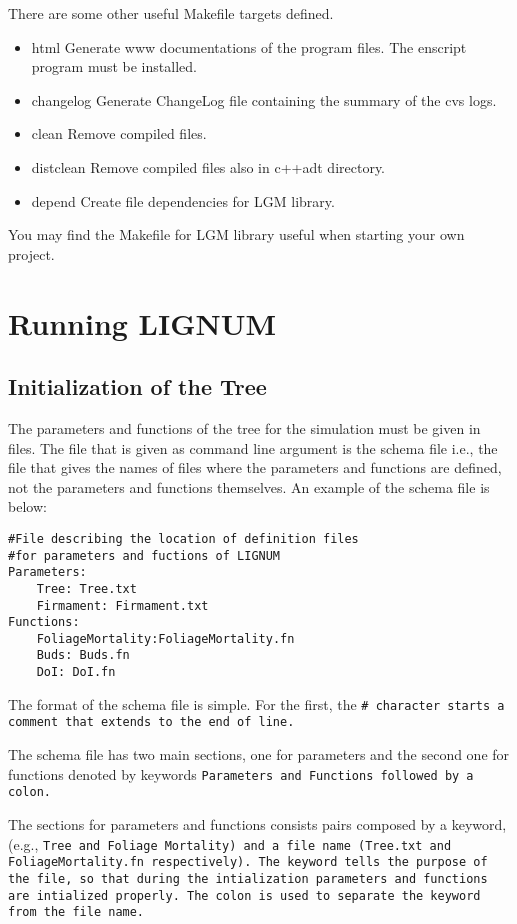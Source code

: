 There are some other useful Makefile targets defined.
\begin{itemize}
\item html Generate www documentations of the program files. The
enscript program must be installed.
\item changelog Generate ChangeLog file containing the summary of the
cvs logs.
\item clean Remove compiled files.
\item distclean Remove compiled files also in c++adt directory.
\item depend Create file dependencies for LGM library.
\end{itemize}
You may find the Makefile for LGM library useful when starting your
own project. 

\section{Running LIGNUM}

\subsection{Initialization of the Tree}

The parameters and functions of the tree for the simulation 
must be given in files. The file that is given as command 
line argument is the schema file i.e., the file that gives the 
names of files where the parameters and functions are defined, 
not the parameters and functions themselves. An example of the schema file
is below:

\begin{verbatim}
#File describing the location of definition files
#for parameters and fuctions of LIGNUM
Parameters:
    Tree: Tree.txt 
    Firmament: Firmament.txt
Functions:
    FoliageMortality:FoliageMortality.fn
    Buds: Buds.fn
    DoI: DoI.fn
\end{verbatim}

The format of the schema file is simple. For the first, the \tt \# \rm
character starts a comment that extends to the end of line.  

The schema file has two main sections, one for parameters and
the second one for functions denoted by keywords 
\tt Parameters \rm and \tt Functions \rm followed by a colon.
 
The sections for parameters and functions consists pairs
composed by a keyword,(e.g., \tt Tree \rm and 
\tt Foliage Mortality\rm) and a file name
(\tt Tree.txt \rm and \tt FoliageMortality.fn \rm respectively). 
The keyword tells the purpose of the file, so that
during the intialization parameters and functions are
intialized properly. The colon is used to separate the
keyword from the file name.

